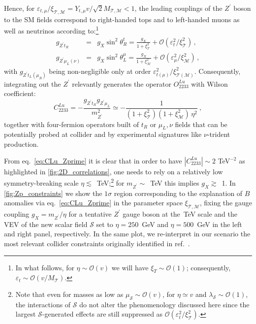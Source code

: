 Hence, for $\varepsilon_{t,\mu}/\xi_{\mathcal{T,M}}= Y_{t,\mu} v/\sqrt{2} M_{\mathcal{T,M}} < 1$, the leading couplings of the $Z^{\prime}$ boson to the SM fields correspond to right-handed tops and to left-handed muons as well as neutrinos according to:\footnote{In what follows, for $\eta \sim \mathcal{O}(v)$ we will have $\xi_{T} \sim \mathcal{O}(1)$; consequently, $\varepsilon_{t} \sim \mathcal{O}(v/M_{\mathcal{T}})$.}
\begin{eqnarray}
	\label{eq:Zprime_to_SM}
	g_{Z^{\prime} t_{R}} & = & g_{X} \sin^2 \theta_{R}^{t} = \frac{g_{X}}{ 1+ \xi^2_{\mathcal{T}}} + \mathcal{O}\left( \varepsilon_{t}^2/\xi_{\mathcal{T}}^2 \right) \, , \\
	g_{Z^{\prime} \mu_{L} (\nu)} & = &  g_{X} \sin^2 \theta_{L}^{\mu} = \frac{g_{X}}{1 + \xi^2_{\mathcal{M}}} 
	+ \mathcal{O}\left( \varepsilon_{\mu}^2 /\xi_{\mathcal{M}}^2 \right) \, ,
\end{eqnarray}
with $g_{Z^{\prime} t_{L} (\mu_{R})}$ being non-negligible only at order $\varepsilon_{t  (\mu)}^2/\xi_{\mathcal{T(M)}}^2$.
Consequently, integrating out the $Z^{\prime}$ relevantly generates the operator $O^{L u}_{2233}$ with Wilson coefficient:
\begin{equation}
	\label{eq:CLu_Zprime}
	C^{L u}_{2233} = - \frac{g_{Z^{\prime} t_{R} } g_{Z^{\prime} \mu_{L}} }{m_{Z^{\prime}}^2} \simeq - \frac{1}{(1+ \xi^2_{\mathcal{T}})(1+ \xi^2_{\mathcal{M}}) \, \eta^{2}} \ ,
\end{equation}
%
together with four-fermion operators built of $t_{R}$ or $\mu_{L},\nu$  fields that can be potentially probed at collider and by experimental signatures like $\nu$-trident production. 

From eq.~\eqref{eq:CLu_Zprime} it is clear that in order to have $|C^{L u}_{2233}| \sim 2 $ TeV$^{-2}$ as highlighted in \autoref{fig:2D_correlations}, one needs to rely on a relatively low symmetry-breaking scale $\eta \lesssim$~TeV;\footnote{Note that even for masses as low as $\mu_{\mathcal{S}} \sim \mathcal{O}(v)$, for $\eta \simeq v$ and $\lambda_{\mathcal{S}} \sim \mathcal{O}(1)$, the interactions of $\mathcal{S}$ do not alter the phenomenology discussed here since the largest $\mathcal{S}$-generated effects are still suppressed as $\mathcal{O}(\varepsilon_{t}^2/\xi^2_{\mathcal{T}})$.} for $m_{Z^{\prime}} \sim$~TeV this implies $g_{X} \gtrsim$~1. In \autoref{fig:Zp_constraints} we show the $1\sigma$ region corresponding to the explanation of $B$ anomalies via eq.~\eqref{eq:CLu_Zprime} in the parameter space $\xi_{\mathcal{T,M}}$, fixing the gauge coupling $g_{X} = m_{Z^{\prime}}/\eta$ for a tentative $Z^{\prime}$ gauge boson at the~TeV scale and the VEV of the new scalar field $\mathcal{S}$ set to $\eta = 250$~GeV and $\eta = 500$~GeV  in the left and right panel, respectively. In the same plot, we re-interpret in our scenario the most relevant collider constraints originally identified in ref.~\cite{Camargo-Molina:2018cwu}. 

